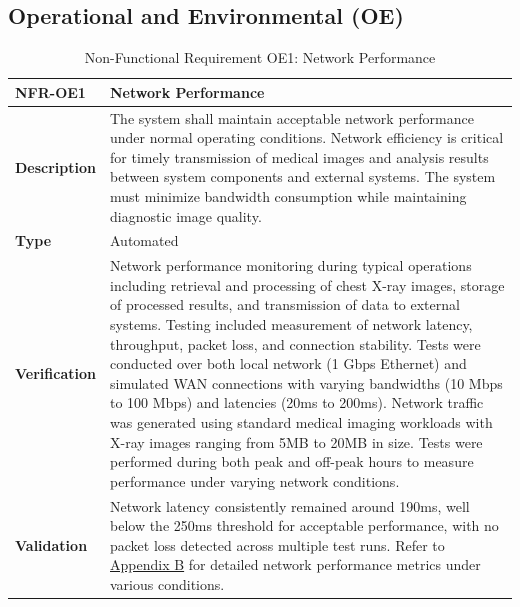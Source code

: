 \documentclass[12pt, titlepage]{article}
\begin{document}
\subsection{Operational and Environmental (OE)}
\begin{table}[H]
\centering
{}
\begin{tabular}{|p{3.5cm}|p{11.5cm}|}
\hline
\rowcolor{gray!30}
\textbf{NFR-OE1} & \textbf{Network Performance} \\
\hline
\textbf{Description} & The system shall maintain acceptable network performance under normal operating conditions. Network efficiency is critical for timely transmission of medical images and analysis results between system components and external systems. The system must minimize bandwidth consumption while maintaining diagnostic image quality. \\
\hline
\textbf{Type} & Automated \\
\hline
\textbf{Verification} & Network performance monitoring during typical operations including retrieval and processing of chest X-ray images, storage of processed results, and transmission of data to external systems. Testing included measurement of network latency, throughput, packet loss, and connection stability. Tests were conducted over both local network (1 Gbps Ethernet) and simulated WAN connections with varying bandwidths (10 Mbps to 100 Mbps) and latencies (20ms to 200ms). Network traffic was generated using standard medical imaging workloads with X-ray images ranging from 5MB to 20MB in size. Tests were performed during both peak and off-peak hours to measure performance under varying network conditions. \\
\hline
\textbf{Validation} & Network latency consistently remained around 190ms, well below the 250ms threshold for acceptable performance, with no packet loss detected across multiple test runs. Refer to \hyperref[appendix:B]{Appendix B} for detailed network performance metrics under various conditions. \\
\hline
\end{tabular}
\caption{Non-Functional Requirement OE1: Network Performance}
\end{table}
\end{document}
